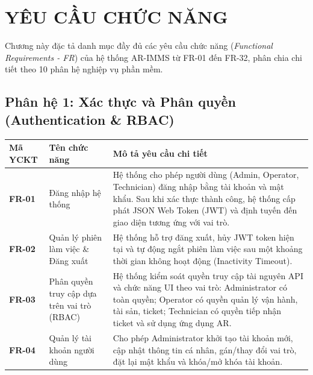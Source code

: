 \chapter{YÊU CẦU CHỨC NĂNG}

Chương này đặc tả danh mục đầy đủ các yêu cầu chức năng (\textit{Functional Requirements - FR}) của hệ thống AR-IMMS từ FR-01 đến FR-32, phân chia chi tiết theo 10 phân hệ nghiệp vụ phần mềm.

\section{Phân hệ 1: Xác thực và Phân quyền (Authentication \& RBAC)}
\begin{longtable}{|p{2.5cm}|p{4cm}|p{8cm}|}
\hline
\textbf{Mã YCKT} & \textbf{Tên chức năng} & \textbf{Mô tả yêu cầu chi tiết} \\ \hline
\endhead
\textbf{FR-01} & Đăng nhập hệ thống & Hệ thống cho phép người dùng (Admin, Operator, Technician) đăng nhập bằng tài khoản và mật khẩu. Sau khi xác thực thành công, hệ thống cấp phát JSON Web Token (JWT) và định tuyến đến giao diện tương ứng với vai trò. \\ \hline
\textbf{FR-02} & Quản lý phiên làm việc \& Đăng xuất & Hệ thống hỗ trợ đăng xuất, hủy JWT token hiện tại và tự động ngắt phiên làm việc sau một khoảng thời gian không hoạt động (Inactivity Timeout). \\ \hline
\textbf{FR-03} & Phân quyền truy cập dựa trên vai trò (RBAC) & Hệ thống kiểm soát quyền truy cập tài nguyên API và chức năng UI theo vai trò: Administrator có toàn quyền; Operator có quyền quản lý vận hành, tài sản, ticket; Technician có quyền tiếp nhận ticket và sử dụng ứng dụng AR. \\ \hline
\textbf{FR-04} & Quản lý tài khoản người dùng & Cho phép Administrator khởi tạo tài khoản mới, cập nhật thông tin cá nhân, gán/thay đổi vai trò, đặt lại mật khẩu và khóa/mở khóa tài khoản. \\ \hline
\end{longtable}

